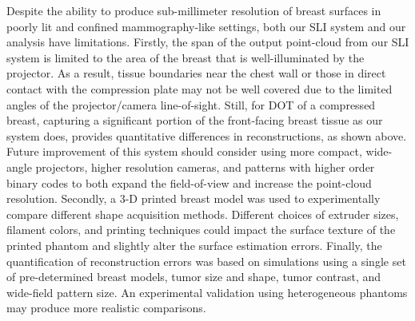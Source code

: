 Despite the ability to produce sub-millimeter resolution of breast surfaces in poorly lit and confined mammography-like settings, both our SLI system and our analysis have limitations. Firstly, the span of the output point-cloud from our SLI system is limited to the area of the breast that is well-illuminated by the projector. As a result, tissue boundaries near the chest wall or those in direct contact with the compression plate may not be well covered due to the limited angles of the projector/camera line-of-sight. Still, for DOT of a compressed breast, capturing a significant portion of the front-facing breast tissue as our system does, provides quantitative differences in reconstructions, as shown above. Future improvement of this system should consider using more compact, wide-angle projectors, higher resolution cameras, and patterns with higher order binary codes to both expand the field-of-view and increase the point-cloud resolution. Secondly, a 3-D printed breast model was used to experimentally compare different shape acquisition methods. Different choices of extruder sizes, filament colors, and printing techniques could impact the surface texture of the printed phantom and slightly alter the surface estimation errors. Finally, the quantification of reconstruction errors was based on simulations using a single set of pre-determined breast models, tumor size and shape, tumor contrast, and wide-field pattern size. An experimental validation using heterogeneous phantoms may produce more realistic comparisons.




